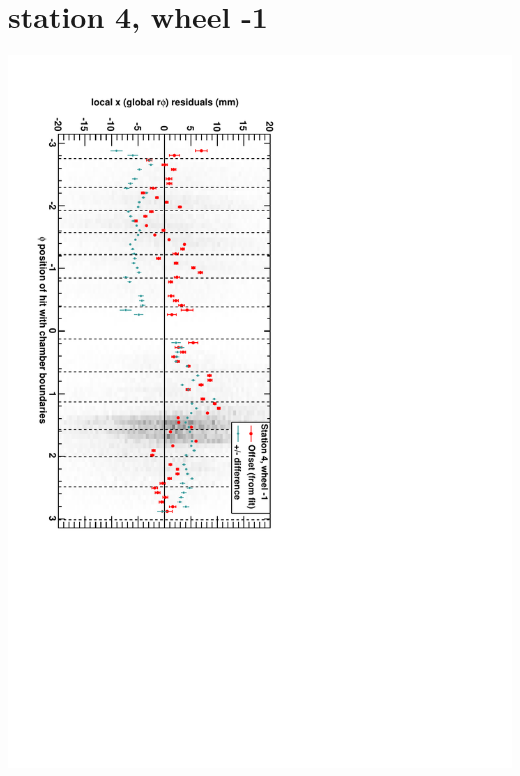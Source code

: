 \documentclass[compress]{beamer}
\begin{document}
\section*{station 4, wheel -1}
\begin{frame} \vfill \mbox{\hspace{-1 cm}\includegraphics[height=1.2\linewidth, angle=90]{DTrphiVsPhi_st4_whB.pdf}} \end{frame}
\end{document}
